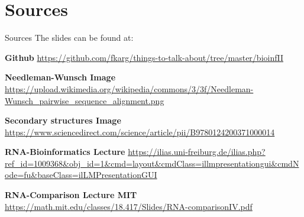 
\section{Sources}

\begin{frame}{Sources}
    The slides can be found at: \newline \newline

    \beamertemplatearticlebibitems
    \begin{thebibliography}{10}

        {\bf Github}
        \newblock \url{https://github.com/fkarg/things-to-talk-about/tree/master/bioinfII}
    \newline

            {\bf Needleman-Wunsch Image}
            \newblock \url{https://upload.wikimedia.org/wikipedia/commons/3/3f/Needleman-Wunsch_pairwise_sequence_alignment.png}

            {\bf Secondary structures Image}
            \newblock \url{https://www.sciencedirect.com/science/article/pii/B9780124200371000014}

            {\bf RNA-Bioinformatics Lecture}
            \newblock \url{https://ilias.uni-freiburg.de/ilias.php?ref_id=1009368&obj\_id=1&cmd=layout&cmdClass=illmpresentationgui&cmdNode=fu&baseClass=ilLMPresentationGUI}

            {\bf RNA-Comparison Lecture MIT}
            \newblock \url{https://math.mit.edu/classes/18.417/Slides/RNA-comparisonIV.pdf}



\end{thebibliography}
\end{frame}
